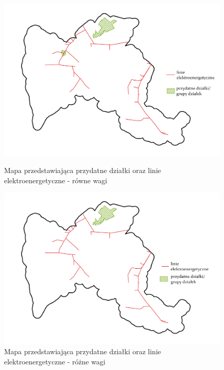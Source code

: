 \documentclass{article}
\begin{document}
\begin{figure}[H]
    \begin{minipage}[t]{0.48\textwidth}
        \centering
        \includegraphics[width=\linewidth]{img/dzialki-linie.jpg}
        \caption{Mapa przedstawiająca przydatne działki oraz linie elektroenergetyczne - równe wagi}
        \label{fig:dzialki-linie-rowne}
    \end{minipage}
    \hfill
    \begin{minipage}[t]{0.48\textwidth}
        \centering
        \includegraphics[width=\linewidth]{img/roznewagi-dzialki-linie.jpg}
        \caption{Mapa przedstawiająca przydatne działki oraz linie elektroenergetyczne - różne wagi}
        \label{fig:dzialki-linie-rozne}
    \end{minipage}
\end{figure}
\end{document}

